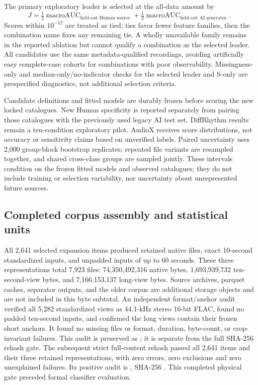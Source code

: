 The primary exploratory leader is selected at the all-data amount by
\[
J=\tfrac{1}{2}\operatorname{macroAUC}_{\text{held-out Human source}}
 +\tfrac{1}{2}\operatorname{macroAUC}_{\text{held-out AI generator}}.
\]
Scores within $10^{-12}$ are treated as tied; ties favor fewer feature families,
then the combination name fixes any remaining tie. A wholly unavailable family remains in the
reported ablation but cannot qualify a combination as the selected leader.
All candidates use the same metadata-qualified recordings, avoiding artificially
easy complete-case cohorts for combinations with poor observability.
Missingness-only and median-only/no-indicator checks for the selected leader and
S-only are prespecified diagnostics, not additional selection criteria.

Candidate definitions and fitted models are durably frozen before scoring the
new locked catalogues. New Human specificity is reported separately from pairing
those catalogues with the previously used legacy AI test set. DiffRhythm results
remain a ten-condition exploratory pilot. AudioX receives score distributions,
not accuracy or sensitivity claims based on unverified labels. Paired uncertainty
uses 2,000 group-block bootstrap replicates; repeated file variants are resampled
together, and shared cross-class groups are sampled jointly.
These intervals condition on the frozen fitted models and observed catalogues;
they do not include training or selection variability, nor uncertainty about
unrepresented future sources.

\subsection{Completed corpus assembly and statistical units}

All 2,641 selected expansion items produced retained native files, exact
10-second standardized inputs, and unpadded inputs of up to 60 seconds. These
three representations total 7,923 files: 74,350,492,316 native bytes,
1,693,939,732 ten-second-view bytes, and 7,166,153,137 long-view bytes. Source
archives, parquet caches, separator outputs, and the older corpus are additional
storage objects and are not included in this byte subtotal.
An independent format/anchor audit verified all 5,282 standardized views as
44.1-kHz stereo 16-bit FLAC, found no padded ten-second inputs, and confirmed the
long views contain their frozen short anchors. It found no missing files or
format, duration, byte-count, or crop-invariant failures. This audit is preserved
as ; it is separate from the
full SHA-256 rehash gate.
The subsequent strict full-content rehash passed all 2,641 items and their
three retained representations, with zero errors, zero exclusions and zero
unexplained failures. Its positive audit is
, SHA-256
.
This completed physical gate preceded formal classifier evaluation.

